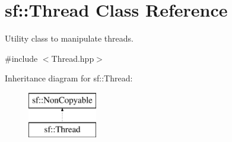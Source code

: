 \hypertarget{classsf_1_1_thread}{}\section{sf\+:\+:Thread Class Reference}
\label{classsf_1_1_thread}


Utility class to manipulate threads.  




{\ttfamily \#include $<$Thread.\+hpp$>$}

Inheritance diagram for sf\+:\+:Thread\+:\begin{figure}[H]
\begin{center}
\leavevmode
\includegraphics[height=2.000000cm]{classsf_1_1_thread}
\end{center}
\end{figure}
